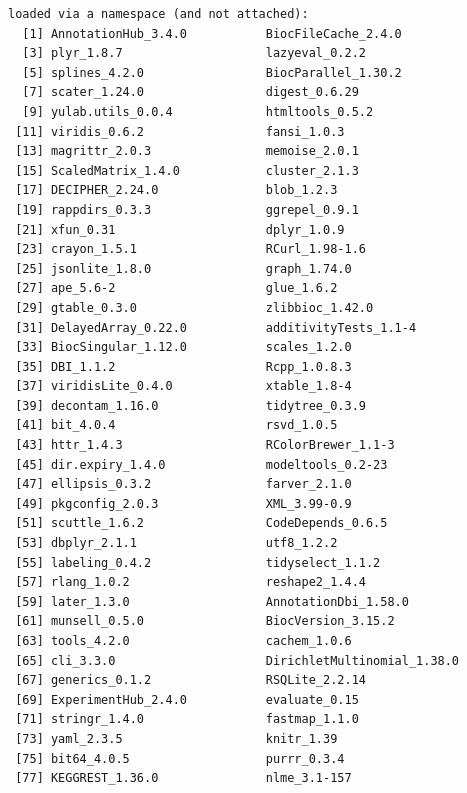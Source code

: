 \documentclass[
]{book}
\begin{document}
\begin{verbatim}
loaded via a namespace (and not attached):
  [1] AnnotationHub_3.4.0           BiocFileCache_2.4.0          
  [3] plyr_1.8.7                    lazyeval_0.2.2               
  [5] splines_4.2.0                 BiocParallel_1.30.2          
  [7] scater_1.24.0                 digest_0.6.29                
  [9] yulab.utils_0.0.4             htmltools_0.5.2              
 [11] viridis_0.6.2                 fansi_1.0.3                  
 [13] magrittr_2.0.3                memoise_2.0.1                
 [15] ScaledMatrix_1.4.0            cluster_2.1.3                
 [17] DECIPHER_2.24.0               blob_1.2.3                   
 [19] rappdirs_0.3.3                ggrepel_0.9.1                
 [21] xfun_0.31                     dplyr_1.0.9                  
 [23] crayon_1.5.1                  RCurl_1.98-1.6               
 [25] jsonlite_1.8.0                graph_1.74.0                 
 [27] ape_5.6-2                     glue_1.6.2                   
 [29] gtable_0.3.0                  zlibbioc_1.42.0              
 [31] DelayedArray_0.22.0           additivityTests_1.1-4        
 [33] BiocSingular_1.12.0           scales_1.2.0                 
 [35] DBI_1.1.2                     Rcpp_1.0.8.3                 
 [37] viridisLite_0.4.0             xtable_1.8-4                 
 [39] decontam_1.16.0               tidytree_0.3.9               
 [41] bit_4.0.4                     rsvd_1.0.5                   
 [43] httr_1.4.3                    RColorBrewer_1.1-3           
 [45] dir.expiry_1.4.0              modeltools_0.2-23            
 [47] ellipsis_0.3.2                farver_2.1.0                 
 [49] pkgconfig_2.0.3               XML_3.99-0.9                 
 [51] scuttle_1.6.2                 CodeDepends_0.6.5            
 [53] dbplyr_2.1.1                  utf8_1.2.2                   
 [55] labeling_0.4.2                tidyselect_1.1.2             
 [57] rlang_1.0.2                   reshape2_1.4.4               
 [59] later_1.3.0                   AnnotationDbi_1.58.0         
 [61] munsell_0.5.0                 BiocVersion_3.15.2           
 [63] tools_4.2.0                   cachem_1.0.6                 
 [65] cli_3.3.0                     DirichletMultinomial_1.38.0  
 [67] generics_0.1.2                RSQLite_2.2.14               
 [69] ExperimentHub_2.4.0           evaluate_0.15                
 [71] stringr_1.4.0                 fastmap_1.1.0                
 [73] yaml_2.3.5                    knitr_1.39                   
 [75] bit64_4.0.5                   purrr_0.3.4                  
 [77] KEGGREST_1.36.0               nlme_3.1-157                 

\end{verbatim}
\end{document}
